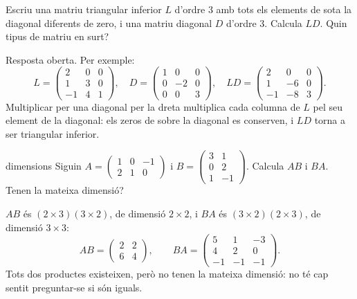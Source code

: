 \begin{apartats}

Escriu una matriu triangular inferior $L$ d'ordre 3 amb tots els elements de sota la diagonal diferents
de zero, i una matriu diagonal $D$ d'ordre 3. Calcula $LD$. Quin tipus de matriu en surt?

\begin{solucio}
Resposta oberta. Per exemple:
\[
L=\begin{pmatrix}2&0&0\\1&3&0\\-1&4&1\end{pmatrix},\quad
D=\begin{pmatrix}1&0&0\\0&-2&0\\0&0&3\end{pmatrix},\quad
LD=\begin{pmatrix}2&0&0\\1&-6&0\\-1&-8&3\end{pmatrix}.
\]
Multiplicar per una diagonal per la dreta multiplica cada columna de $L$ pel seu element de la diagonal:
els zeros de sobre la diagonal es conserven, i $LD$ torna a ser triangular inferior.
\end{solucio}

\begin{tria}{dimensions}
Siguin
$A=\begin{pmatrix}1&0&-1\\2&1&0\end{pmatrix}$ i
$B=\begin{pmatrix}3&1\\0&2\\1&-1\end{pmatrix}$.
Calcula $AB$ i $BA$. Tenen la mateixa dimensió?

\begin{solucio}
$AB$ és $(2\times3)(3\times2)$, de dimensió $2\times2$, i $BA$ és $(3\times2)(2\times3)$, de dimensió
$3\times3$:
\[
AB=\begin{pmatrix}2&2\\6&4\end{pmatrix},\qquad
BA=\begin{pmatrix}5&1&-3\\4&2&0\\-1&-1&-1\end{pmatrix}.
\]
Tots dos productes existeixen, però no tenen la mateixa dimensió: no té cap sentit preguntar-se si són
iguals.
\end{solucio}


\end{tria}
\end{apartats}
